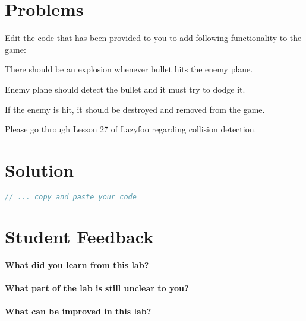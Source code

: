 \documentclass[11pt,fleqn]{book} %
\begin{document}
\section{Problems}
Edit the code that has been provided to you to add following functionality to the game:\\
\begin{problem} There should be an explosion whenever bullet hits the enemy plane.\\
\end{problem}
\begin{problem} Enemy plane should detect the bullet and it must try to dodge it.\\
\end{problem}
\begin{problem} If the enemy is hit, it should be destroyed and removed from the game.
\end{problem}

\begin{tcolorbox}[width=\textwidth,colback={white},title={KEYNOTE},colbacktitle=purple!50!white,coltitle=black] 
  Please go through Lesson 27 of Lazyfoo regarding collision detection.
\end{tcolorbox}

\newpage
\section{Solution}
\begin{lstlisting}[language=C++]
  // ... copy and paste your code
\end{lstlisting}

\newpage
\section{Student Feedback}
\textbf{What did you learn from this lab?}\\
\noindent\fbox{\parbox{\textwidth}{
  }
}\\
\textbf{What part of the lab is still unclear to you?}\\
\noindent\fbox{\parbox{\textwidth}{
  }
}\\
\textbf{What can be improved in this lab?}\\ 
\noindent\fbox{\parbox{\textwidth}{
  }
}

\newpage
{} %
\end{document}
